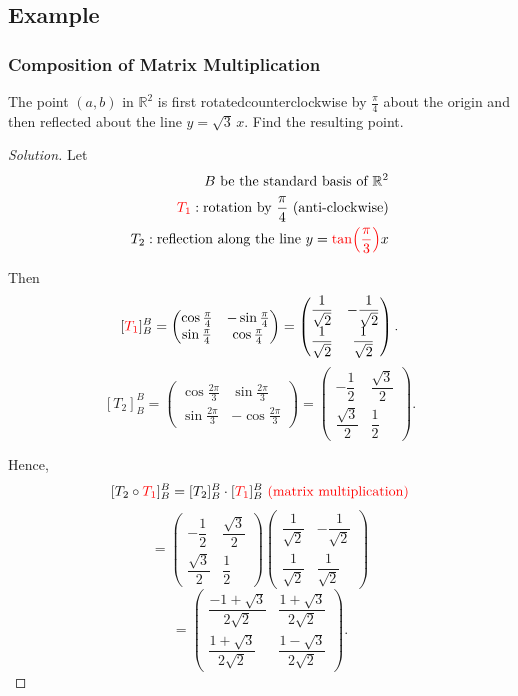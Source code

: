 \documentclass[12pt]{article}
\newenvironment{solution}
{\begin{proof}[Solution]}
{\end{proof}}
\begin{document}
\subsection{Example}

\subsubsection{Composition of Matrix Multiplication}

The point $(a,b)$ in $\mathbb{R}^2$ is first rotatedcounterclockwise by $\frac{\pi}4$ about the origin and then
reflected about the line $y=\sqrt3\,x$. Find the resulting point.


\begin{solution}

Let 
\begin{align*}
\text{$B$ be the standard basis of $\mathbb{R}^2$}\\
\textcolor{red}{T_1}:\text{rotation by }\frac{\pi}{4}\text{ (anti-clockwise)}\\
T_2:\text{reflection along the line }y=\textcolor{red}{\tan\!\left(\frac{\pi}{3}\right)}x
\end{align*}

Then
\[
[\textcolor{red}{T_1}]_B^B=
\begin{pmatrix}
\cos\frac{\pi}{4} & -\sin\frac{\pi}{4}\\
\sin\frac{\pi}{4} & \cos\frac{\pi}{4}
\end{pmatrix}
=
\begin{pmatrix}
\dfrac1{\sqrt2} & -\dfrac1{\sqrt2}\\[2mm]
\dfrac1{\sqrt2} & \dfrac1{\sqrt2}
\end{pmatrix}.
\]
\[
[T_2]_B^B=
\begin{pmatrix}
\cos\frac{2\pi}{3} & \sin\frac{2\pi}{3}\\
\sin\frac{2\pi}{3} & -\cos\frac{2\pi}{3}
\end{pmatrix}
=
\begin{pmatrix}
-\dfrac12 & \dfrac{\sqrt3}{2}\\[2mm]
\dfrac{\sqrt3}{2} & \dfrac12
\end{pmatrix}.
\]

\newpage

Hence, 
\[
[T_2\circ \textcolor{red}{T_1}]_B^B=[T_2]_B^B\cdot[\textcolor{red}{T_1}]_B^B \textcolor{red}{\text{ (matrix multiplication)}}
\]
\[
=
\begin{pmatrix}
-\dfrac12 & \dfrac{\sqrt3}{2}\\[2mm]
\dfrac{\sqrt3}{2} & \dfrac12
\end{pmatrix}
\begin{pmatrix}
\dfrac1{\sqrt2} & -\dfrac1{\sqrt2}\\[2mm]
\dfrac1{\sqrt2} & \dfrac1{\sqrt2}
\end{pmatrix}
\]
\[
=
\begin{pmatrix}
\dfrac{-1+\sqrt3}{2\sqrt2}
&
\dfrac{1+\sqrt3}{2\sqrt2}
\\[3mm]
\dfrac{1+\sqrt3}{2\sqrt2}
&
\dfrac{1-\sqrt3}{2\sqrt2}
\end{pmatrix}.
\]


\end{solution}
\end{document}

